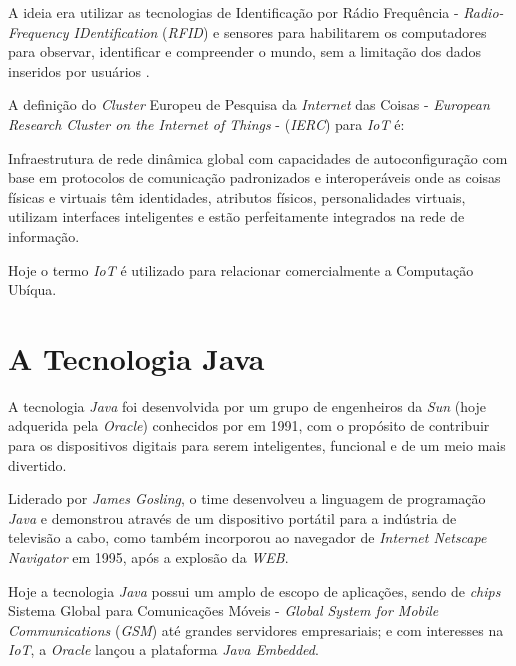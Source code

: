 A ideia era utilizar as tecnologias de Identificação por Rádio Frequência -
\textit{Radio-Frequency IDentification} (\textit{RFID}) e sensores para habilitarem 
os computadores para observar, identificar e compreender o mundo, sem a 
limitação dos dados inseridos por usuários \cite{kevinashton2009}.

\newpage
A definição do \textit{Cluster} Europeu de Pesquisa da \textit{Internet} das 
Coisas - \textit{European Research Cluster on the Internet of Things} - 
(\textit{IERC}) \cite[p. ~26]{iangsmith2012} para \textit{IoT} é:

\begin{citacao}
    Infraestrutura de rede dinâmica global com capacidades de autoconfiguração 
    com base em protocolos de comunicação padronizados e interoperáveis onde as 
    coisas físicas e virtuais têm identidades, atributos físicos, 
    personalidades virtuais, utilizam interfaces inteligentes e estão 
    perfeitamente integrados na rede de informação.
\end{citacao}

Hoje o termo \textit{IoT} é utilizado para relacionar comercialmente a Computação Ubíqua.

\section{A Tecnologia Java}

A tecnologia \textit{Java} foi desenvolvida por um grupo de engenheiros da 
\textit{Sun} (hoje adquerida pela \textit{Oracle}) conhecidos por 
 em 1991, com o propósito de contribuir para os 
dispositivos digitais para serem inteligentes, funcional e de um meio mais 
divertido.

Liderado por \textit{James Gosling}, o time desenvolveu a linguagem de 
programação \textit{Java} e demonstrou através de um dispositivo portátil para 
a indústria de televisão a cabo, como também incorporou ao navegador de 
\textit{Internet Netscape Navigator} em 1995, após a explosão da \textit{WEB}.

Hoje a tecnologia \textit{Java} possui um amplo de escopo de aplicações, sendo 
de \textit{chips} Sistema Global para Comunicações Móveis - \textit{Global 
System for Mobile Communications} (\textit{GSM}) até grandes servidores 
empresariais; e com interesses na \textit{IoT}, a 
\textit{Oracle} lançou a plataforma \textit{Java Embedded}.
